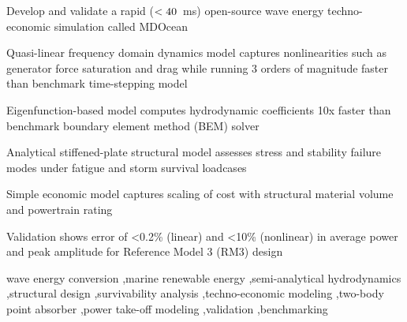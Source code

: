 \documentclass[preprint,12pt]{elsarticle}
\newcommand{\summarytexcount}[1]{\textbf{Word Count}
  \immediate\write18{texcount -nosub -inc -sum=[1,1,1,0,0,0,0] -q -brief -template="{title}:\\n   {sum} words, {float} figs/tables, {dsmath} full equations, {inline} inline equations.\\n" #1.tex > #1.wcsum }%
}
\newcommand{\detailtexcount}[2]{\textbf{Section Breakdown #1}
  \immediate\write18{texcount -sub=#2 -inc -sum=[1,1,1,0,0,0,0] -q -brief -template="{SUB?{title}:\\n {sum} words, {float} figs/tables, {dsmath} full equations, {inline} inline equations.\\n?SUB}\\n" #1.tex > #1.wcdetail }%
  
}%
\begin{document}
\begin{frontmatter}
\begin{highlights}
\item Develop and validate a rapid ($<40$~ms) open-source wave energy techno-economic simulation called MDOcean
\item Quasi-linear frequency domain dynamics model captures nonlinearities such as generator force saturation and drag while running 3 orders of magnitude faster than benchmark time-stepping model
\item Eigenfunction-based model computes hydrodynamic coefficients 10x faster than benchmark boundary element method (BEM) solver
\item Analytical stiffened-plate structural model assesses stress and stability failure modes under fatigue and storm survival loadcases
\item Simple economic model captures scaling of cost with structural material volume and powertrain rating
\item Validation shows error of <0.2\% (linear) and <10\% (nonlinear) in average power and peak amplitude for Reference Model 3 (RM3) design
\end{highlights}

\begin{keyword}
wave energy conversion \sep marine renewable energy \sep semi-analytical hydrodynamics \sep structural design \sep survivability analysis \sep techno-economic modeling \sep two-body point absorber \sep power take-off modeling \sep validation \sep benchmarking



\end{keyword}

\end{frontmatter}



\tableofcontents
\listoffigures
\listoftables
\clearpage
\end{document}
